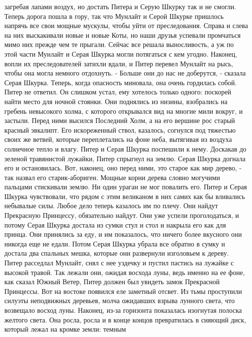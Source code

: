 загребая лапами воздух, но достать Питера и Серую Шкурку так и не 
смогли.
    Теперь дорога пошла в гору, так что Мунлайт и Серой Шкурке 
пришлось напрячь все свои мощные мускулы, чтобы уйти от преследования. 
Справа и слева на них выскакивали новые и новые Коты, но наши друзья 
успевали промчаться мимо них прежде чем те прыгали.
    Сейчас все решала выносливость, а уж по этой части Мунлайт и Серая 
Шкурка могли потягаться с кем угодно. Наконец, вопли их 
преследователей затихли вдали, и Питер перевел Мунлайт на рысь, чтобы 
она могла немного отдохнуть.
    - Больше они до нас не доберутся, - сказала Серая Шкурка. Теперь, 
когда опасность миновала, она очень гордилась собой.
    Питер не ответил. Он слишком устал, ему хотелось только одного: 
поскорей найти место для ночной стоянки.
    Они поднялись из низины, взобрались на гребень невысокого холма, с 
которого открывался вид на многие мили вокруг, и застыли. Перед ними 
высился Последний Холм, а на его вершине рос старый красный эвкалипт. 
Его искореженный ствол, казалось, согнулся под тяжестью своих же 
ветвей, которые переплетались на фоне неба, вытягивая из воздуха 
солнечное тепло и влагу.
    Питер и Серая Шкурка поспешили к нему. Доскакав до зеленой 
травянистой лужайки, Питер спрыгнул на землю. Серая Шкурка догнала его 
и остановилась. Вот, наконец, оно перед ними, это старое как мир 
дерево, - так назвал его старик-абориген. Мощные корни дерева словно 
могучими пальцами стискивали землю. Ни один ураган не мог повалить 
его. Питер и Серая Шкурка чувствовали, что рядом с этим великаном в 
них самих как бы вливались небывалые силы. Любое дело теперь казалось 
им по плечу. Они найдут Прекрасную Принцессу, обязательно найдут.
    Они уже успели проголодаться, и потому Серая Шкурка достала из 
сумки стул и стол и накрыла его как для принца. Они принялись за еду, 
и им показалось, что ничего более вкусного они никогда еще не едали. 
Потом Серая Шкурка убрала все обратно в сумку и достала два спальных 
мешка, которые они развернули изголовьем к дереву. Питер расседлал 
Мунлайт, снял с нее уздечку и пустил пастись на лужайке с высокой 
травой.
    Так лежали они, ожидая восхода луны, ведь именно на ее фоне, как 
сказал Южный Ветер, Питер должен был увидеть замок Прекрасной 
Принцессы.
    Вот на востоке появился еле заметный отсвет. Из тьмы проступили 
силуэты неподвижных деревьев, молча ожидавших взрыва лунного света, 
что возвещало восход луны. Наконец, из-за горизонта показалась 
изогнутая полоска желтого света. Она росла, росла и в конце концов 
превратилась в сияющий диск, который лежал на кромке земли: темным 

